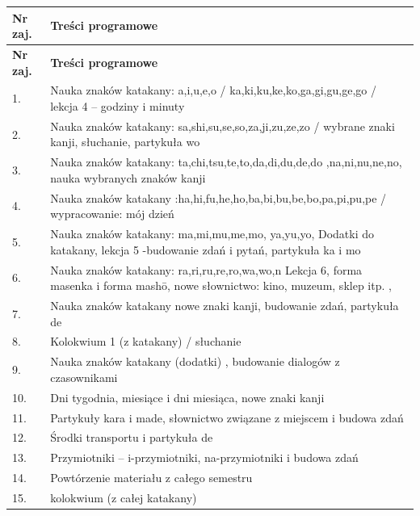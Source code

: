 \documentclass[12pt, a4paper]{article}
\newcommand{\thdrule}{\noalign{\global\setlength{\extrarowheight}{0pt}}}
\newcommand{\thdend}{\noalign{\global\setlength{\extrarowheight}{3pt}}}
\begin{document}
{\scriptsize
\begin{longtable}{m{1.5cm}m{14.5cm}}
\thdrule\toprule
\rowcolor{pjatkRed} {\color{white}\textbf{Nr zaj.}} & {\color{white}\textbf{Treści programowe}} \\
\midrule\thdend
\endfirsthead
\thdrule\toprule
\rowcolor{pjatkRed} {\color{white}\textbf{Nr zaj.}} & {\color{white}\textbf{Treści programowe}} \\
\midrule\thdend
\endhead
  \rowcolor{tableRowLight} 1. & Nauka znaków katakany: a,i,u,e,o /  ka,ki,ku,ke,ko,ga,gi,gu,ge,go / lekcja 4 – godziny i minuty \\
  \rowcolor{tableRowAlt} 2. & Nauka znaków katakany:  sa,shi,su,se,so,za,ji,zu,ze,zo /  wybrane znaki kanji, słuchanie, partykuła wo \\
  \rowcolor{tableRowLight} 3. & Nauka znaków katakany:  ta,chi,tsu,te,to,da,di,du,de,do ,na,ni,nu,ne,no, nauka wybranych znaków kanji \\
  \rowcolor{tableRowAlt} 4. & Nauka znaków katakany :ha,hi,fu,he,ho,ba,bi,bu,be,bo,pa,pi,pu,pe / wypracowanie: mój dzień \\
  \rowcolor{tableRowLight} 5. & Nauka znaków katakany: ma,mi,mu,me,mo, ya,yu,yo, Dodatki do katakany, lekcja 5 -budowanie zdań i pytań, partykuła ka i mo \\
  \rowcolor{tableRowAlt} 6. & Nauka znaków katakany: ra,ri,ru,re,ro,wa,wo,n   Lekcja 6, forma masenka i forma mashō, nowe słownictwo: kino, muzeum, sklep itp. , \\
  \rowcolor{tableRowLight} 7. & Nauka znaków katakany nowe znaki kanji, budowanie zdań, partykuła de \\
  \rowcolor{tableRowAlt} 8. & Kolokwium 1 (z katakany) / słuchanie \\
  \rowcolor{tableRowLight} 9. & Nauka znaków katakany (dodatki) , budowanie dialogów z czasownikami \\
  \rowcolor{tableRowAlt} 10. & Dni tygodnia, miesiące i dni miesiąca, nowe znaki kanji \\
  \rowcolor{tableRowLight} 11. & Partykuły kara i made, słownictwo związane z miejscem i budowa zdań \\
  \rowcolor{tableRowAlt} 12. & Środki transportu i partykuła de \\
  \rowcolor{tableRowLight} 13. & Przymiotniki – i-przymiotniki, na-przymiotniki  i budowa zdań \\
  \rowcolor{tableRowAlt} 14. & Powtórzenie materiału z całego semestru \\
  \rowcolor{tableRowLight} 15. & kolokwium (z całej katakany) \\
\bottomrule
\end{longtable}}
\end{document}

